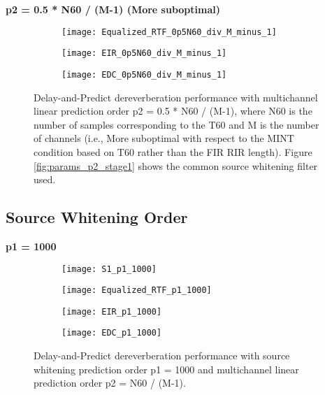 \textbf{p2 = 0.5 * N60 / (M-1) (More suboptimal)}

\begin{figure}[H]
	\centering
	\begin{subfigure}[b]{0.32\textwidth}
		\centering
		\texttt{[image: Equalized\_RTF\_0p5N60\_div\_M\_minus\_1]}
	\end{subfigure}
	\hfill
	\begin{subfigure}[b]{0.32\textwidth}
		\centering
		\texttt{[image: EIR\_0p5N60\_div\_M\_minus\_1]}
	\end{subfigure}
	\hfill
	\begin{subfigure}[b]{0.32\textwidth}
		\centering
		\texttt{[image: EDC\_0p5N60\_div\_M\_minus\_1]}
	\end{subfigure}
	\hfill
	\caption{Delay-and-Predict dereverberation performance with multichannel linear prediction order p2 = 0.5 * N60 / (M-1), where N60 is the number of samples corresponding to the T60 and M is the number of channels (i.e., More suboptimal with respect to the MINT condition based on T60 rather than the FIR RIR length). Figure \ref{fig:params_p2_stage1} shows the common source whitening filter used.}
	\label{fig:params_p2_0p5_N60}
\end{figure}

\subsection{Source Whitening Order}

\textbf{p1 = 1000}

\begin{figure}[H]
	\centering
	\begin{subfigure}[b]{0.49\textwidth}
		\centering
		\texttt{[image: S1\_p1\_1000]}
	\end{subfigure}
	\hfill
	\begin{subfigure}[b]{0.49\textwidth}
		\centering
		\texttt{[image: Equalized\_RTF\_p1\_1000]}
	\end{subfigure}
	\hfill
	\begin{subfigure}[b]{0.49\textwidth}
		\centering
		\texttt{[image: EIR\_p1\_1000]}
	\end{subfigure}
	\hfill
	\begin{subfigure}[b]{0.49\textwidth}
		\centering
		\texttt{[image: EDC\_p1\_1000]}
	\end{subfigure}
	\hfill
	\caption{Delay-and-Predict dereverberation performance with source whitening prediction order p1 = 1000 and multichannel linear prediction order p2 = N60 / (M-1).}
	\label{fig:params_p1_1000}
\end{figure}

